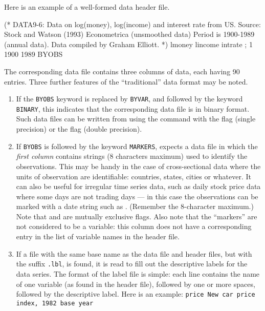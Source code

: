 Here is an example of a well-formed data header file.

	
\begin{code} 
	  (* 
	  DATA9-6: 
	  Data on log(money), log(income) and interest rate from US. 
	  Source: Stock and Watson (1993) Econometrica 
	  (unsmoothed data) Period is 1900-1989 (annual data). 
	  Data compiled by Graham Elliott. 
	  *) 
	  lmoney lincome intrate ; 
	  1 1900 1989 BYOBS
\end{code}

The corresponding data file contains three columns of data, each
having 90 entries.  Three further features of the ``traditional'' data
format may be noted.
    
\begin{enumerate}
\item If the \verb+BYOBS+ keyword is replaced by \verb+BYVAR+, and
  followed by the keyword \verb+BINARY+, this indicates that the
  corresponding data file is in binary format.  Such data files can be
  written from  using the  command with the
   flag (single precision) or the  flag (double
  precision).
\item If \verb+BYOBS+ is followed by the keyword \verb+MARKERS+,
   expects a data file in which the \emph{first column}
  contains strings (8 characters maximum) used to identify the
  observations.  This may be handy in the case of cross-sectional data
  where the units of observation are identifiable: countries, states,
  cities or whatever.  It can also be useful for irregular time series
  data, such as daily stock price data where some days are not trading
  days --- in this case the observations can be marked with a date
  string such as .  (Remember the 8-character maximum.)
  Note that  and  are mutually exclusive
  flags.  Also note that the ``markers'' are not considered to be a
  variable: this column does not have a corresponding entry in the
  list of variable names in the header file.
\item If a file with the same base name as the data file and header
  files, but with the suffix \verb+.lbl+, is found, it is read to fill
  out the descriptive labels for the data series. The format of the
  label file is simple: each line contains the name of one variable
  (as found in the header file), followed by one or more spaces,
  followed by the descriptive label. Here is an example:
  \verb+price New car price index, 1982 base year+

	
\end{enumerate}


